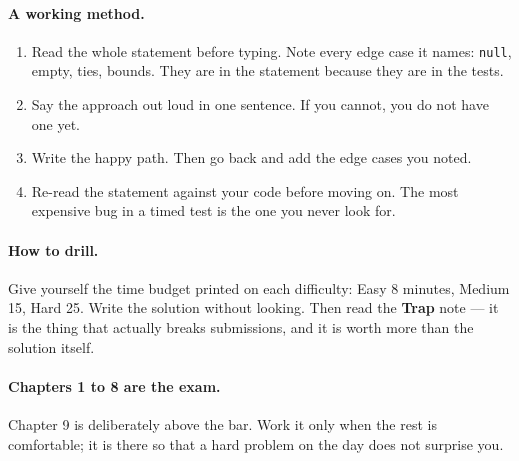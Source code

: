 \documentclass[11pt,a4paper]{article}
\begin{document}
\paragraph{A working method.}
\begin{enumerate}
  \item Read the whole statement before typing. Note every edge case it names:
        \texttt{null}, empty, ties, bounds. They are in the statement because
        they are in the tests.
  \item Say the approach out loud in one sentence. If you cannot, you do not
        have one yet.
  \item Write the happy path. Then go back and add the edge cases you noted.
  \item Re-read the statement against your code before moving on. The most
        expensive bug in a timed test is the one you never look for.
\end{enumerate}

\paragraph{How to drill.} Give yourself the time budget printed on each
difficulty: Easy 8 minutes, Medium 15, Hard 25. Write the solution without
looking. Then read the \textbf{Trap} note --- it is the thing that actually
breaks submissions, and it is worth more than the solution itself.

\paragraph{Chapters 1 to 8 are the exam.} Chapter 9 is deliberately above the
bar. Work it only when the rest is comfortable; it is there so that a hard
problem on the day does not surprise you.

\clearpage
\tableofcontents
\clearpage

\end{document}
